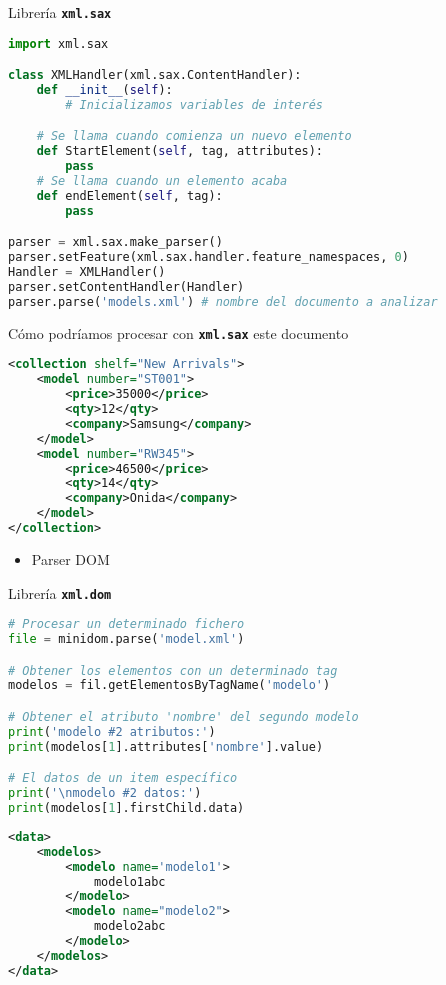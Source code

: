 Librería \texttt{\textbf{xml.sax}}
\begin{lstlisting}[language=python]
import xml.sax

class XMLHandler(xml.sax.ContentHandler):
    def __init__(self):
        # Inicializamos variables de interés

    # Se llama cuando comienza un nuevo elemento
    def StartElement(self, tag, attributes):
        pass
    # Se llama cuando un elemento acaba
    def endElement(self, tag):
        pass

parser = xml.sax.make_parser()
parser.setFeature(xml.sax.handler.feature_namespaces, 0)
Handler = XMLHandler()
parser.setContentHandler(Handler)
parser.parse('models.xml') # nombre del documento a analizar
\end{lstlisting}
Cómo podríamos procesar con \texttt{\textbf{xml.sax}} este documento
\begin{lstlisting}[language=XML]
<collection shelf="New Arrivals">
    <model number="ST001">
        <price>35000</price>
        <qty>12</qty>
        <company>Samsung</company>
    </model>
    <model number="RW345">
        <price>46500</price>
        <qty>14</qty>
        <company>Onida</company>
    </model>
</collection>
\end{lstlisting}
\begin{itemize}[label=\color{red}\textbullet, leftmargin=*]
	\item \color{lightblue}Parser DOM
\end{itemize}
Librería \textbf{\texttt{xml.dom}}

\begin{minipage}{0.55\textwidth}
\begin{lstlisting}[language=python]
# Procesar un determinado fichero
file = minidom.parse('model.xml')

# Obtener los elementos con un determinado tag
modelos = fil.getElementosByTagName('modelo')

# Obtener el atributo 'nombre' del segundo modelo
print('modelo #2 atributos:')
print(modelos[1].attributes['nombre'].value)

# El datos de un item específico
print('\nmodelo #2 datos:')
print(modelos[1].firstChild.data)
\end{lstlisting}
\end{minipage}\qquad\begin{minipage}{0.4\textwidth}
\begin{lstlisting}[language=XML]
<data>
    <modelos>
        <modelo name='modelo1'>
            modelo1abc
        </modelo>
        <modelo name="modelo2">
            modelo2abc
        </modelo>
    </modelos>
</data>
\end{lstlisting}
\end{minipage}

